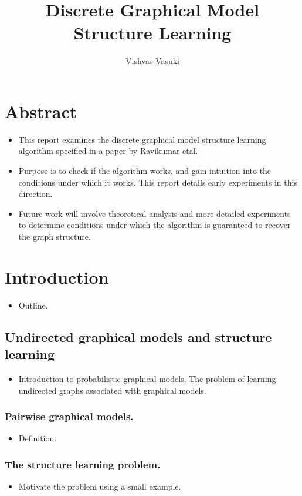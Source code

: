 \documentclass{article}
\title{Discrete Graphical Model Structure Learning}
\author{Vishvas Vasuki}
\begin{document}
\maketitle

\section{Abstract}
\begin{itemize}
 \item This report examines the discrete graphical model structure learning algorithm specified in a paper by Ravikumar etal.
 \item Purpose is to check if the algorithm works, and gain intuition into the conditions under which it works. This report details early experiments in this direction.
 \item Future work will involve theoretical analysis and more detailed experiments to determine conditions under which the algorithm is guaranteed to recover the graph structure.
\end{itemize}


\section{Introduction}
\begin{itemize}
 \item Outline.
\end{itemize}

\subsection{Undirected graphical models and structure learning}
\begin{itemize}
 \item Introduction to probabilistic graphical models. The problem of learning undirected graphs associated with graphical models.
\end{itemize}

\subsubsection{Pairwise graphical models.}
\begin{itemize}
 \item Definition.
\end{itemize}

\subsubsection{The structure learning problem.}
\begin{itemize}
 \item Motivate the problem using a small example.
\end{itemize}
\end{document}
